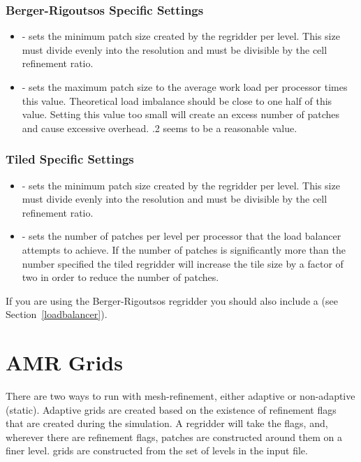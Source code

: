 \subsubsection{Berger-Rigoutsos Specific Settings }
\begin{itemize}
\item {} - sets the minimum patch size created by the
  regridder per level. This size must divide evenly into the
  resolution and must be divisible by the cell refinement ratio.
\item {} - sets the maximum patch size to the
  average work load per processor times this value. Theoretical load
  imbalance should be close to one half of this value. Setting this
  value too small will create an excess number of patches and cause
  excessive overhead. .2 seems to be a reasonable value.
\end{itemize}

\subsubsection{Tiled Specific Settings }
\begin{itemize}
\item {} - sets the minimum patch size created by the
  regridder per level. This size must divide evenly into the
  resolution and must be divisible by the cell refinement ratio.
\item {} - sets the number of patches per
  level per processor that the load balancer attempts to achieve. If
  the number of patches is significantly more than the number
  specified the tiled regridder will increase the tile size by a
  factor of two in order to reduce the number of patches.
\end{itemize}

If you are using the Berger-Rigoutsos regridder you should also
include a   (see Section~\ref{loadbalancer}).

\section{AMR Grids}
There are two ways to run with mesh-refinement, either adaptive or
non-adaptive (static). Adaptive grids are created based on the
existence of refinement flags that are created during the
simulation. A regridder will take the flags, and, wherever there are
refinement flags, patches are constructed around them on a finer
level. grids are constructed from the set of levels in the input file.

